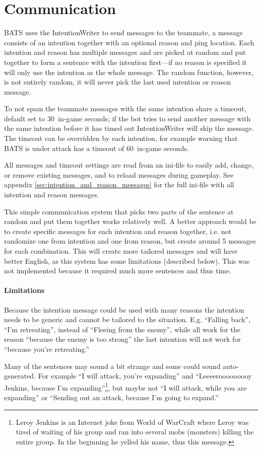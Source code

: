 \section{Communication}
\label{sec:communication}
BATS uses the IntentionWriter to send messages to the teammate, a message consists of an
intention together with an optional reason and ping location.
Each intention and reason has multiple messages and are picked at random and put together to form a 
sentence with the intention first—if no reason is specified it will only use the intention as
the whole message. The random function, however, is not entirely random, it will never pick the last
used intention or reason message.

To not spam the teammate messages with the same intention share a timeout, default set to 30\conf~in-game
seconds; if the bot tries to send another message with the same intention before it has timed out
IntentionWriter will skip the message. The timeout can be overridden by each intention, for example
warning that BATS is under attack has a timeout of 60\conf~in-game seconds.

All messages and timeout settings are read from an ini-file to easily add, change, or remove
existing messages, and to reload messages during gameplay. See appendix
\ref{sec:intention_and_reason_messages} for the full ini-file with all intention and reason
messages.

This simple communication system that picks two parts of the sentence at random and put them
together works relatively well. A better approach would be to create
specific messages for each intention and reason together, i.e. not randomize one from intention
and one from reason, but create around 5 messages for each combination. This will create more
tailored messages and will have better English, as this system has some limitations (described
below). This was not implemented because it required much more sentences and thus time.

\paragraph{Limitations}
Because the intention message could be used with many reasons the intention needs to be generic and
cannot be tailored to the situation. E.g. ``Falling back'', ``I'm retreating'', instead of ``Fleeing
from the enemy'', while all work for the reason ``because the enemy is too strong'' the last
intention will not work for ``because you're retreating.''

Many of the sentences may sound a bit strange and some could sound auto-generated. For example ``I
will attack, you're expanding'' and ``Leeeerooooooooy Jenkins, because I'm
expanding''\footnote{Leroy Jenkins is an Internet joke from World of WarCraft where Leroy was tired
of waiting of his group and ran into several mobs (monsters) killing the entire group. In the
beginning he yelled his name, thus this message.}, but maybe not ``I will attack, while you are
expanding'' or ``Sending out an attack, because I'm going to expand.''
